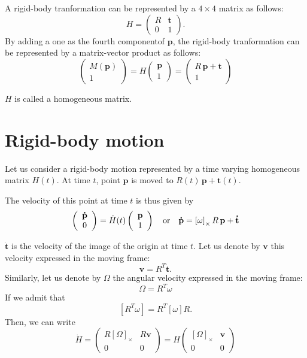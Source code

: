 \documentclass{article}
\newcommand\vect[1]{\mathbf{#1}}
\newcommand\trans{\mathbf{t}}
\newcommand\dtrans{\mathbf{\dot{t}}}
\begin{document}
A rigid-body tranformation can be represented by a $4\times4$ matrix as follows:
$$
H = \left(\begin{array}{cc}
  R & \trans\\
  0 & 1
\end{array}\right).
$$
By adding a one as the fourth componentof $\vect{p}$, the rigid-body tranformation can be represented by a matrix-vector product as follows:
$$
\left(\begin{array}{c}M(\vect{p})\\1\end{array}\right) = H\left(\begin{array}{c}\vect{p}\\1\end{array}\right) = \left(\begin{array}{c}R\,\vect{p}+\trans\\1\end{array}\right)
$$

$H$ is called a homogeneous matrix.
      
\section{Rigid-body motion}

Let us consider a rigid-body motion represented by a time varying homogeneous matrix $H(t)$.
At time $t$, point $\vect{p}$ is moved to $R(t)\,\vect{p}+\trans(t)$.

The velocity of this point at time $t$ is thus given by
$$
\left(\begin{array}{c}\vect{\dot{p}}\\0\end{array}\right) = \dot{H}(t)\left(\begin{array}{c}\vect{p}\\1\end{array}\right)\\
\ \ \ \mbox{or}\ \ \ \vect{\dot{p}} = \left[\omega\right]_{\times} R\,\vect{p}+\dtrans
$$

$\dtrans$ is the velocity of the image of the origin at time $t$. Let us denote by $\vect{v}$ this velocity expressed in the moving frame:
$$
\vect{v} = R^T\dtrans.
$$
Similarly, let us denote by $\Omega$ the angular velocity expressed in the moving frame:
$$
\Omega = R^T \omega
$$
If we admit that
$$
\left[R^T\omega\right] = R^T\left[\omega\right] R.
$$
Then, we can write
\begin{equation}\label{eq:diff-SE3}
\dot{H} = \left(\begin{array}{cc}R \left[\Omega\right]_{\times} & R\vect{v}\\0 & 0\end{array}\right)=
  H \left(\begin{array}{cc} \left[\Omega\right]_{\times} & \vect{v}\\0 & 0\end{array}\right)
\end{equation}
\end{document}
